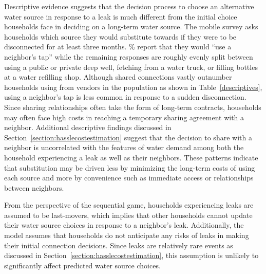 \documentclass[12pt]{article}
\begin{document}
Descriptive evidence suggests that the decision process to choose an alternative water source in response to a leak is much different from the initial choice households face in deciding on a long-term water source.  The mobile survey asks households which source they would substitute towards if they were to be disconnected for at least three months.  \unskip\% report that they would ``use a neighbor's tap'' while the remaining responses are roughly evenly split between using a public or private deep well, fetching from a water truck, or filling bottles at a water refilling shop.  Although shared connections vastly outnumber households using from vendors in the population as shown in Table~\ref{descriptives}, using a neighbor's tap is less common in response to a sudden disconnection.  Since sharing relationships often take the form of long-term contracts, households may often face high costs in reaching a temporary sharing agreement with a neighbor.  Additional descriptive findings discussed in Section~\ref{section:hasslecostestimation} suggest that the decision to share with a neighbor is uncorrelated with the features of water demand among both the household experiencing a leak as well as their neighbors.  These patterns indicate that substitution may be driven less by minimizing the long-term costs of using each source and more by convenience such as immediate access or relationships between neighbors.

From the perspective of the sequential game, households experiencing leaks are assumed to be last-movers, which implies that other households cannot update their water source choices in response to a neighbor's leak.  Additionally, the model assumes that households do not anticipate any risks of leaks in making their initial connection decisions.  Since leaks are relatively rare events as discussed in Section~\ref{section:hasslecostestimation}, this assumption is unlikely to significantly affect predicted water source choices.  
\end{document}
